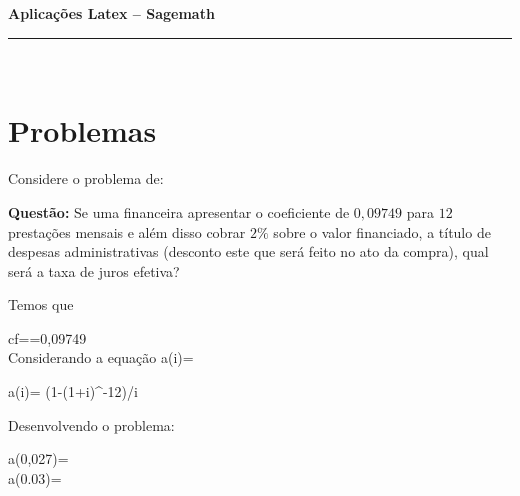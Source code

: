 \documentclass[11pt,a4paper]{article}
\newcommand{\nomer}{\bf Aplicações  Latex -- Sagemath}
\begin{document}
\Large
\large
\begin{center}
\noindent  \nomer
\end{center}
\hfill   %
\hrule\ 
\section*{\sc Problemas}
Considere o problema de\cite{fina2007mathias}:
 


{\bf Questão: }Se uma financeira apresentar o coeficiente de $0,09749$ para $12$ prestações mensais e além disso cobrar $2\%$ sobre o valor financiado, a título de despesas administrativas (desconto este que será feito no ato da compra), qual será a taxa de juros efetiva?

{\sol Temos que}

\ben
cf==0,09749\\
\een
Considerando a equação
\ben
a(i)= 
\een
\begin{sagesilent}
a(i)= (1-(1+i)^-12)/i
\end{sagesilent}


Desenvolvendo o problema:

\ben
a(0,027)=\\
a(0.03)=\\
\een

\printbibliography
\end{document}
